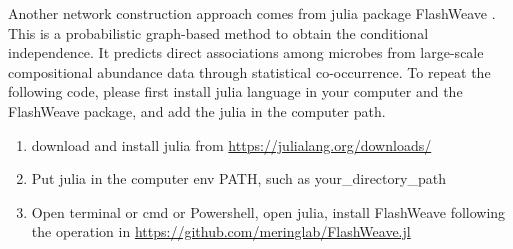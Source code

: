 \documentclass[
]{book}
\newenvironment{Shaded}{\begin{snugshade}}{\end{snugshade}}
\newcommand{\AttributeTok}[1]{\textcolor[rgb]{0.13,0.29,0.53}{#1}}
\newcommand{\CommentTok}[1]{\textcolor[rgb]{0.56,0.35,0.01}{\textit{#1}}}
\newcommand{\ConstantTok}[1]{\textcolor[rgb]{0.56,0.35,0.01}{#1}}
\newcommand{\FloatTok}[1]{\textcolor[rgb]{0.00,0.00,0.81}{#1}}
\newcommand{\FunctionTok}[1]{\textcolor[rgb]{0.13,0.29,0.53}{\textbf{#1}}}
\newcommand{\NormalTok}[1]{#1}
\newcommand{\OtherTok}[1]{\textcolor[rgb]{0.56,0.35,0.01}{#1}}
\newcommand{\SpecialCharTok}[1]{\textcolor[rgb]{0.81,0.36,0.00}{\textbf{#1}}}
\newcommand{\StringTok}[1]{\textcolor[rgb]{0.31,0.60,0.02}{#1}}
\providecommand{\tightlist}{%
  \setlength{\itemsep}{0pt}\setlength{\parskip}{0pt}}
\begin{document}
\begin{Shaded}
\end{Shaded}

Another network construction approach comes from julia package FlashWeave \citep{Tackmann_Rapid_2019}.
This is a probabilistic graph-based method to obtain the conditional independence.
It predicts direct associations among microbes from large-scale compositional abundance data through statistical co-occurrence.
To repeat the following code, please first install julia language in your computer and the FlashWeave package, and add the julia in the computer path.

\begin{enumerate}
\def\labelenumi{\arabic{enumi}.}
\tightlist
\item
  download and install julia from \url{https://julialang.org/downloads/}\\
\item
  Put julia in the computer env PATH, such as your\_directory\_path\Julia\bin  
\item
  Open terminal or cmd or Powershell, open julia, install FlashWeave following the operation in \url{https://github.com/meringlab/FlashWeave.jl}
\end{enumerate}
\end{document}
